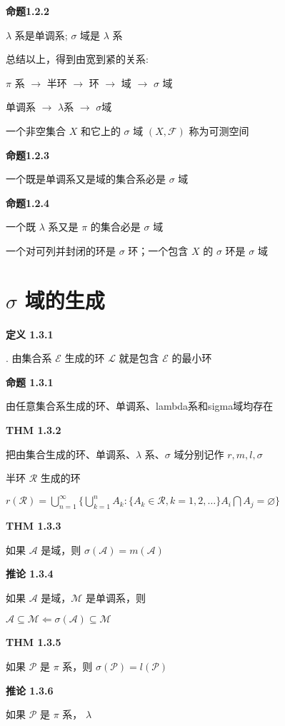 \documentclass[UTF8]{book}
\begin{document}
\vspace*{12pt}

\textbf{命题1.2.2}\par
\quad\quad $\lambda$ 系是单调系; $\sigma$ 域是 $\lambda$ 系\par

\vspace*{12pt}

总结以上，得到由宽到紧的关系:\par
$\pi$ 系 $\rightarrow$ 半环 $\rightarrow$ 环 $\rightarrow$ 域 $\rightarrow$ $\sigma$ 域\par
单调系 $\rightarrow$ $\lambda$系 $\rightarrow$ $\sigma$域\par

\vspace*{12pt}

一个非空集合 $X$ 和它上的 $\sigma $ 域 $(X,\mathscr{F})$ 称为可测空间\par
\newpage
\textbf{命题1.2.3}\par
\quad\quad 一个既是单调系又是域的集合系必是 $\sigma$ 域\par

\textbf{命题1.2.4}\par
\quad\quad 一个既 $\lambda$ 系又是 $\pi$ 的集合必是 $\sigma$ 域\par
\quad\quad 一个对可列并封闭的环是 $\sigma$ 环；一个包含 $X$ 的 $\sigma$ 环是 $\sigma$ 域
\newpage

\section{$\sigma$ 域的生成}
\textbf{定义 1.3.1}\par
\quad{}. 由集合系 $\mathscr{E}$ 生成的环 $\mathscr{L}$ 就是包含 $\mathscr{E}$ 的最小环\par \quad{}\par
\textbf{命题 1.3.1}\par
\quad\quad 由任意集合系生成的环、单调系、lambda系和sigma域均存在\par

\vspace*{12pt}

\textbf{THM 1.3.2}\par
\quad\quad 把由集合生成的环、单调系、$\lambda$ 系、$\sigma$ 域分别记作 $r, m, l, \sigma$\par
\quad\quad 半环 $\mathscr{R}$ 生成的环\par
\quad\quad $r(\mathscr{R}) = \bigcup_{n=1}^\infty\{\bigcup_{k=1}^nA_k:\{A_k\in \mathscr{R},k=1,2,\ldots \}{A_i\bigcap A_j = \varnothing}\}$\par
\textbf{THM 1.3.3}\par
\quad\quad 如果 $\mathscr{A}$ 是域，则 $\sigma(\mathscr{A}) = m(\mathscr{A})$\par
\textbf{推论 1.3.4}\par
\quad\quad 如果 $\mathscr{A}$ 是域，$\mathscr{M}$ 是单调系，则\par
\quad\quad $\mathscr{A}\subseteq \mathscr{M}\Longleftarrow\sigma(\mathscr{A})\subseteq\mathscr{M}$

\textbf{THM 1.3.5}\par
\quad\quad 如果 $\mathscr{P}$ 是 $\pi$ 系，则 $\sigma(\mathscr{P}) = l(\mathscr{P})$\par
\textbf{推论 1.3.6}\par
\quad\quad 如果 $\mathscr{P}$ 是 $\pi$ 系， $\lambda$


\vspace*{12pt}
\end{document}
